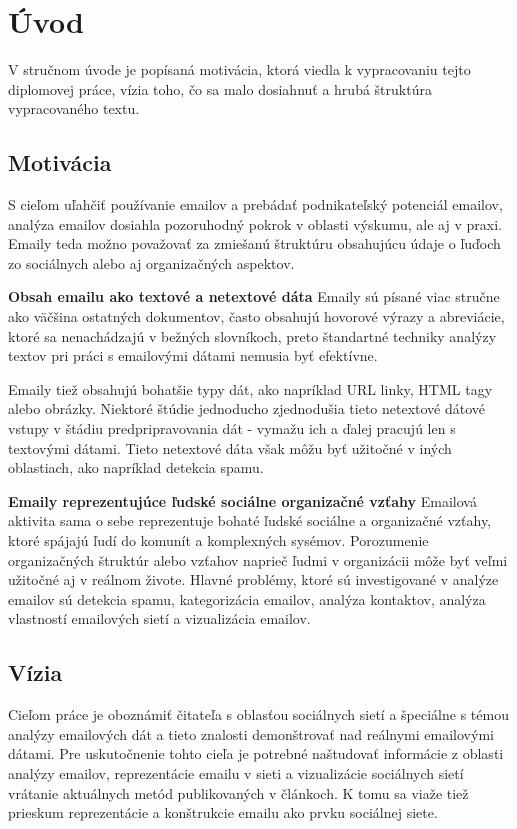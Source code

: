 \documentclass[slovak,master,public,dept460,male,cpdeclaration,oneside]{diploma}
\begin{document}
\MakeTitlePages


\section{Úvod}
V stručnom úvode je popísaná motivácia, ktorá viedla k vypracovaniu tejto diplomovej práce, vízia toho, čo sa malo dosiahnuť a hrubá štruktúra vypracovaného textu.

\subsection{Motivácia}
S cieľom uľahčiť používanie emailov a prebádať podnikateľský potenciál emailov, analýza emailov dosiahla pozoruhodný pokrok v oblasti výskumu, ale aj v praxi. Emaily teda možno považovať za zmiešanú štruktúru obsahujúcu údaje o ľuďoch zo sociálnych alebo aj organizačných aspektov.

\textbf{Obsah emailu ako textové a netextové dáta} 
\newline Emaily sú písané viac stručne ako väčšina ostatných dokumentov, často obsahujú hovorové výrazy a abreviácie, ktoré sa nenachádzajú v bežných slovníkoch, preto štandartné techniky analýzy textov pri práci s emailovými dátami  nemusia byť efektívne.

Emaily tiež obsahujú bohatšie typy dát, ako napríklad URL linky, HTML tagy alebo obrázky. Niektoré štúdie jednoducho zjednodušia tieto netextové dátové vstupy v štádiu predpripravovania dát - vymažu ich a ďalej pracujú len s textovými dátami. Tieto netextové dáta však môžu byť užitočné v iných oblastiach, ako napríklad detekcia spamu. 


\textbf{Emaily reprezentujúce ľudské sociálne organizačné vzťahy} 
\newline Emailová aktivita sama o sebe reprezentuje bohaté ľudské sociálne a organizačné vzťahy, ktoré spájajú ľudí do komunít a komplexných sysémov. Porozumenie organizačných štruktúr alebo vzťahov naprieč ľudmi v organizácii môže byť veľmi užitočné aj v reálnom živote. 
Hlavné problémy, ktoré sú investigované v analýze emailov sú detekcia spamu, kategorizácia emailov, analýza kontaktov, analýza vlastností emailových sietí a vizualizácia emailov.

\subsection{Vízia}
Cieľom práce je oboznámiť čitateľa s oblasťou sociálnych sietí a špeciálne s témou analýzy emailových dát a tieto znalosti demonštrovať nad reálnymi emailovými dátami. Pre uskutočnenie tohto cieľa je potrebné naštudovať informácie z oblasti analýzy emailov, reprezentácie emailu v sieti a vizualizácie sociálnych sietí vrátanie aktuálnych metód publikovaných v článkoch. K tomu sa viaže tiež prieskum reprezentácie a konštrukcie emailu ako prvku sociálnej siete. 
\end{document}
